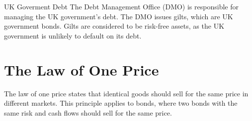 \begin{definitionbox}{UK Goverment Debt}
    The Debt Management Office (DMO) is responsible for managing the UK government's debt. The DMO issues gilts, which are UK government bonds. Gilts are considered to be risk-free assets, as the UK government is unlikely to default on its debt.
\end{definitionbox}

\section{The Law of One Price}
The law of one price states that identical goods should sell for the same price in different markets. This principle applies to bonds, where two bonds with the same risk and cash flows should sell for the same price.


